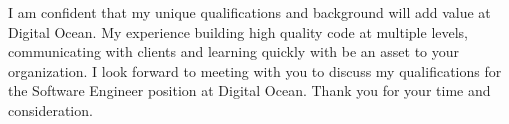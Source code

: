 \documentclass[11pt, a4paper]{awesome-cv}
\begin{document}
\begin{cvletter}
    I am confident that my unique qualifications and background will add value at Digital Ocean. My experience building high quality code at multiple levels, communicating with clients and learning quickly with be an asset to your organization. I look forward to meeting with you to discuss my qualifications for the Software Engineer position at Digital Ocean. Thank you for your time and consideration.\\
    

\end{cvletter}

\makeletterclosing
\end{document}
